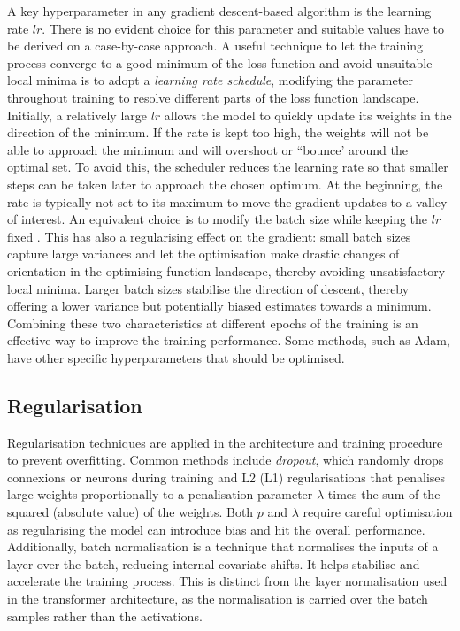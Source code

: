 A key hyperparameter in any gradient descent-based algorithm is the learning rate $lr$. There is no evident choice for this parameter and suitable values have to be derived on a case-by-case approach. A useful technique to let the training process converge to a good minimum of the loss function and avoid unsuitable local minima is to adopt a \textit{learning rate schedule}, modifying the parameter throughout training to resolve different parts of the loss function landscape. Initially, a relatively large $lr$ allows the model to quickly update its weights in the direction of the minimum. If the rate is kept too high, the weights will not be able to approach the minimum and will overshoot or ``bounce' around the optimal set. To avoid this, the scheduler reduces the learning rate so that smaller steps can be taken later to approach the chosen optimum. At the beginning, the rate is typically not set to its maximum to move the gradient updates to a valley of interest. An equivalent choice is to modify the batch size while keeping the $lr$ fixed \cite{smith2017decay}. This has also a regularising effect on the gradient: small batch sizes capture large variances and let the optimisation make drastic changes of orientation in the optimising function landscape, thereby avoiding unsatisfactory local minima. Larger batch sizes stabilise the direction of descent, thereby offering a lower variance but potentially biased estimates towards a minimum. Combining these two characteristics at different epochs of the training is an effective way to improve the training performance. Some methods, such as Adam, have other specific hyperparameters that should be optimised.

\subsection{Regularisation}
Regularisation techniques are applied in the architecture and training procedure to prevent overfitting. Common methods include \textit{dropout}, which randomly drops connexions or neurons during training and L2 (L1) regularisations that penalises large weights proportionally to a penalisation parameter $\lambda$ times the sum of the squared (absolute value) of the weights. Both $p$ and $\lambda$ require careful optimisation as regularising the model can introduce bias and hit the overall performance. Additionally, batch normalisation is a technique that normalises the inputs of a layer over the batch, reducing internal covariate shifts. It helps stabilise and accelerate the training process. This is distinct from the layer normalisation used in the transformer architecture, as the normalisation is carried over the batch samples rather than the activations. 

